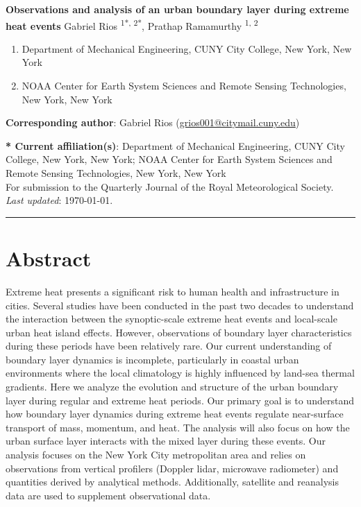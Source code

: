 \documentclass[11pt,a4paper]{article}
\begin{document}

\textbf{Observations and analysis of an urban boundary layer during extreme heat events}
Gabriel Rios \textsuperscript{1*, 2*}, Prathap Ramamurthy \textsuperscript{1, 2}

\small{
\begin{enumerate}[leftmargin=0.5cm, itemsep=0mm]
	\item Department of Mechanical Engineering, CUNY City College, New York, New York
	\item NOAA Center for Earth System Sciences and Remote Sensing Technologies, New York, New York
\end{enumerate}
}

\textbf{Corresponding author}: Gabriel Rios (\href{mailto:grios001@citymail.cuny.edu}{grios001@citymail.cuny.edu})

\textbf{* Current affiliation(s)}: Department of Mechanical Engineering, CUNY City College, New York, New York; NOAA Center for Earth System Sciences and Remote Sensing Technologies, New York, New York \\

\small{For submission to the Quarterly Journal of the Royal Meteorological Society.} \\
\small{\textit{Last updated}: \today.}

\noindent\rule{\textwidth}{1pt}

\linenumbers


\section*{Abstract}

Extreme heat presents a significant risk to human health and infrastructure in cities. Several studies have been conducted in the past two decades to understand the interaction between the synoptic-scale extreme heat events and local-scale urban heat island effects. However, observations of boundary layer characteristics during these periods have been relatively rare. Our current understanding of boundary layer dynamics is incomplete, particularly in coastal urban environments where the local climatology is highly influenced by land-sea thermal gradients. Here we analyze the evolution and structure of the urban boundary layer during regular and extreme heat periods. Our primary goal is to understand how boundary layer dynamics during extreme heat events regulate near-surface transport of mass, momentum, and heat. The analysis will also focus on how the urban surface layer interacts with the mixed layer during these events. Our analysis focuses on the New York City metropolitan area and relies on observations from vertical profilers (Doppler lidar, microwave radiometer) and quantities derived by analytical methods. Additionally, satellite and reanalysis data are used to supplement observational data. 
\end{document}

